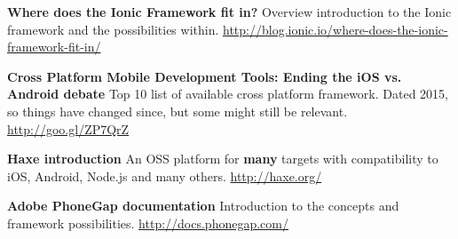 \textbf{Where does the Ionic Framework fit in?} \newline
Overview introduction to the Ionic framework and the possibilities within. \newline
\url{http://blog.ionic.io/where-does-the-ionic-framework-fit-in/}

\textbf{Cross Platform Mobile Development Tools: \newline Ending the iOS vs. Android debate} \newline
Top 10 list of available cross platform framework. Dated 2015, so things have changed since, but some might still be relevant. \newline
\url{http://goo.gl/ZP7QrZ}

\textbf{Haxe introduction} \newline
An OSS platform for \textbf{many} targets with compatibility to iOS, Android, Node.js and many others. \newline
\url{http://haxe.org/}

\textbf{Adobe PhoneGap documentation} \newline
Introduction to the concepts and framework possibilities. \newline
\url{http://docs.phonegap.com/}